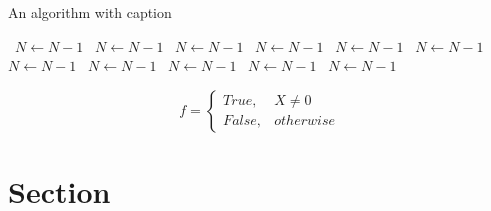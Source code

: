 \documentclass[a4paper]{article}
\begin{document}
\begin{algorithm}
\caption{An algorithm with caption}
\begin{algorithmic}
\    \State $N \gets N - 1$
\    \State $N \gets N - 1$
\    \State $N \gets N - 1$
\    \State $N \gets N - 1$
\    \State $N \gets N - 1$
\    \State $N \gets N - 1$
\    \State $N \gets N - 1$
\    \State $N \gets N - 1$
\    \State $N \gets N - 1$
\    \State $N \gets N - 1$
\    \State $N \gets N - 1$
\EndWhile
\end{algorithmic}
\end{algorithm}

\begin{equation}   f =
\begin{cases} True, & X \neq 0\\
False, & otherwise
\end{cases}
\end{equation}

\section{Section}
\end{document}
